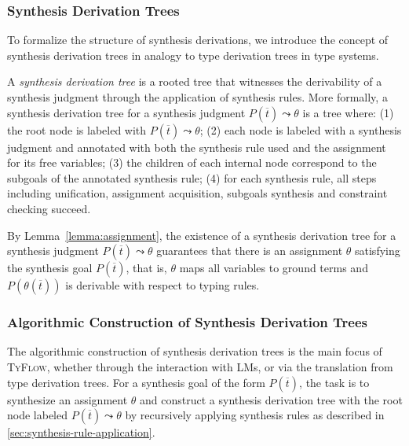 \documentclass[manuscript,screen]{acmart}
\newcommand{\skhzc}[1]{#1}
\newcommand{\toolname}[1]{\textsc{#1}}
\newcommand{\mainname}{\toolname{TyFlow}\xspace}
\begin{document}
\subsubsection{Synthesis Derivation Trees}
\label{sec:synthesis-derivation-tree}
To formalize the structure of synthesis derivations, we introduce the concept of synthesis derivation trees in analogy to type derivation trees in type systems. 

A \emph{synthesis derivation tree} is a rooted tree that witnesses the derivability of a synthesis judgment through the application of synthesis rules. More formally, a synthesis derivation tree for a synthesis judgment $P(\skhzc{\overline{t}}) \leadsto \theta$ is a tree where: (1) the root node is labeled with $P(\skhzc{\overline{t}}) \leadsto \theta$; (2) each node is labeled with a synthesis judgment and annotated with both the synthesis rule used and the assignment for its free variables; (3) the children of each internal node correspond to the subgoals of the annotated synthesis rule; (4) for each synthesis rule, all steps including unification, assignment acquisition, subgoals synthesis and constraint checking succeed.

By Lemma~\ref{lemma:assignment}, the existence of a synthesis derivation tree for a synthesis judgment $P(\overline{t}) \leadsto \theta$ guarantees that there is an assignment $\theta$ satisfying the synthesis goal $P(\overline{t})$, that is, $\theta$ maps all variables to ground terms and    {\color{revblue}$P(\theta(\overline{t}))$ } is derivable with respect to typing rules.

\subsubsection{Algorithmic Construction of Synthesis Derivation Trees}
\label{sec:synthtree-construction-query}
The algorithmic construction of synthesis derivation trees is the main focus of \mainname, whether through the interaction with LMs, or via the translation from type derivation trees.
For a synthesis goal of the form $P(\overline{t})$, the task is to synthesize an assignment $\theta$ and construct a synthesis derivation tree with the root node labeled $P(\overline{t}) \leadsto \theta$ by recursively applying synthesis rules as described in \autoref{sec:synthesis-rule-application}.
\end{document}
